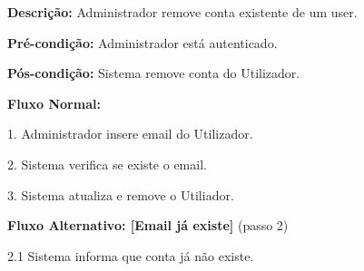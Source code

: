 \textbf{Descrição:} Administrador remove conta existente de um user.

\textbf{Pré-condição:} Administrador está autenticado.

\textbf{Pós-condição:} Sistema remove conta do Utilizador. 

\textbf{Fluxo Normal:}	

1. Administrador insere email do Utilizador.

2. Sistema verifica se existe o email.

3. Sistema atualiza e remove o Utiliador.

\textbf{Fluxo Alternativo: [Email já existe]} (passo 2)

2.1 Sistema informa que conta já não existe.